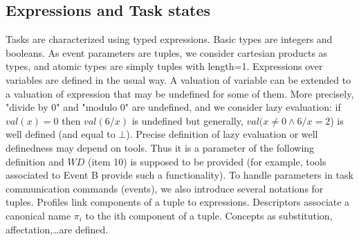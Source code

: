 \documentclass{article}
\begin{document}
\subsection{Expressions and Task states}
Tasks are characterized using typed expressions. Basic types are integers and booleans. As event parameters are tuples, we consider cartesian products as types, and atomic types are simply tuples with length=1. Expressions over variables are defined in the usual way. A valuation of variable can be extended to a valuation of expression that may be undefined for some of them. More precisely, "divide by 0" and "modulo 0" are undefined, and we consider lazy evaluation: if $val(x)=0$ then $val(6/x)$ is undefined but generally, $val(x\neq 0\wedge 6/x=2$) is well defined (and equal to $\bot$). Precise definition of lazy evaluation or well definedness may depend on tools. Thus it is a parameter of the following definition and $W\!D$ (item 10) is supposed to be provided (for example, tools associated to Event B provide such a functionality). To handle parameters in task communication commands (events), we also introduce several notations for tuples. Profiles link components of a tuple to expressions. Descriptors associate a canonical name $\pi_i$ to the ith component of a tuple. Concepts as substitution, affectation,\ldots are defined.
\end{document}
